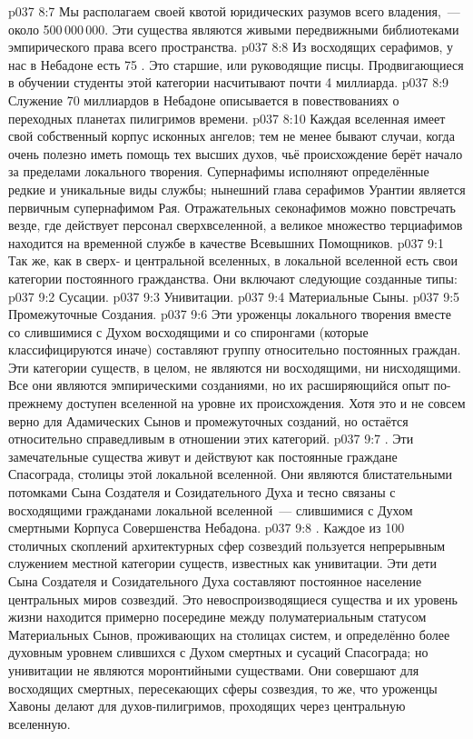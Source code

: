 \vs p037 8:7 Мы располагаем своей квотой  юридических разумов всего владения,~--- около 500\,000\,000. Эти существа являются живыми передвижными библиотеками эмпирического права всего пространства.
\vs p037 8:8 Из восходящих серафимов, у нас в Небадоне есть 75 . Это старшие, или руководящие писцы. Продвигающиеся в обучении студенты этой категории насчитывают почти 4 миллиарда.
\vs p037 8:9 Служение 70 миллиардов  в Небадоне описывается в повествованиях о переходных планетах пилигримов времени.
\vs p037 8:10 \pc Каждая вселенная имеет свой собственный корпус исконных ангелов; тем не менее бывают случаи, когда очень полезно иметь помощь тех высших духов, чьё происхождение берёт начало за пределами локального творения. Супернафимы исполняют определённые редкие и уникальные виды службы; нынешний глава серафимов Урантии является первичным супернафимом Рая. Отражательных секонафимов можно повстречать везде, где действует персонал сверхвселенной, а великое множество терциафимов находится на временной службе в качестве Всевышних Помощников.
\vs p037 9:1 Так же, как в сверх- и центральной вселенных, в локальной вселенной есть свои категории постоянного гражданства. Они включают следующие созданные типы:
\vs p037 9:2 Сусации.
\vs p037 9:3 Унивитации.
\vs p037 9:4 Материальные Сыны.
\vs p037 9:5 Промежуточные Создания.
\vs p037 9:6 \pc Эти уроженцы локального творения вместе со слившимися с Духом восходящими и со спиронгами (которые классифицируются иначе) составляют группу относительно постоянных граждан. Эти категории существ, в целом, не являются ни восходящими, ни нисходящими. Все они являются эмпирическими созданиями, но их расширяющийся опыт по\hyp{}прежнему доступен вселенной на уровне их происхождения. Хотя это и не совсем верно для Адамических Сынов и промежуточных созданий, но остаётся относительно справедливым в отношении этих категорий.
\vs p037 9:7 \pc {}. Эти замечательные существа живут и действуют как постоянные граждане Спасограда, столицы этой локальной вселенной. Они являются блистательными потомками Сына Создателя и Созидательного Духа и тесно связаны с восходящими гражданами локальной вселенной~--- слившимися с Духом смертными Корпуса Совершенства Небадона.
\vs p037 9:8 \pc {}. Каждое из 100 столичных скоплений архитектурных сфер созвездий пользуется непрерывным служением местной категории существ, известных как унивитации. Эти дети Сына Создателя и Созидательного Духа составляют постоянное население центральных миров созвездий. Это невоспроизводящиеся существа и их уровень жизни находится примерно посередине между полуматериальным статусом Материальных Сынов, проживающих на столицах систем, и определённо более духовным уровнем слившихся с Духом смертных и сусаций Спасограда; но унивитации не являются моронтийными существами. Они совершают для восходящих смертных, пересекающих сферы созвездия, то же, что уроженцы Хавоны делают для духов\hyp{}пилигримов, проходящих через центральную вселенную.
